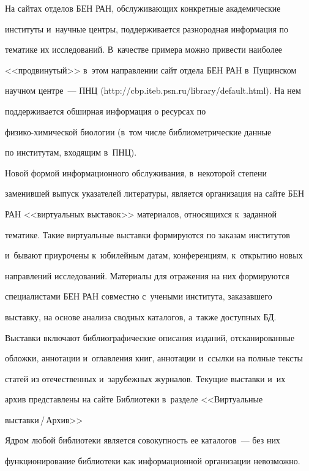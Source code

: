   


  На сайтах отделов БЕН РАН, обслуживающих конкретные академические 


институты и~научные центры, поддерживается разнородная информация по 


тематике их исследований. В~качестве примера можно привести наиболее 


<<продвинутый>> в~этом направлении сайт отдела БЕН РАН в~Пущинском 


научном центре~--- ПНЦ ({\sf http://cbp.iteb.psn.ru/library/default.html}). На нем 


поддерживается обширная информация о ресурсах по  


фи\-зи\-ко-хи\-ми\-че\-ской биологии (в~том числе библиометрические данные 


по институтам, входящим в~ПНЦ). 


  


  Новой формой информационного обслуживания, в~некоторой степени 


заменившей выпуск указателей литературы, является организация на сайте БЕН 


РАН <<виртуальных выставок>> материалов, относящихся к~заданной 


тематике. Такие виртуальные выставки формируются по заказам институтов 


и~бывают приурочены к~юбилейным датам, конференциям, к~открытию новых 


направлений исследований. Материалы для отражения на них формируются 


специалистами БЕН РАН совместно с~учеными института, заказавшего 


выставку, на основе анализа сводных каталогов, а~также доступных БД. 


Выставки включают библиографические описания изданий, отсканированные 


обложки, аннотации и~оглавления книг, аннотации и~ссылки на полные тексты 


статей из отечественных и~зарубежных журналов. Текущие выставки и~их 


архив представлены на сайте Библиотеки в~разделе <<Виртуальные  


выс\-тав\-ки\,/\,Ар\-хив>> 


  


  Ядром любой библиотеки является совокупность ее каталогов~--- без них 


функционирование библиотеки как информационной организации невозможно. 



